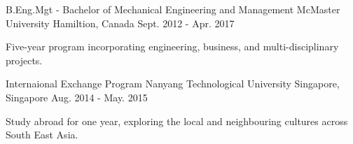 

\begin{cventries}

  \cventry
    {B.Eng.Mgt - Bachelor of Mechanical Engineering and Management} %
    {McMaster University} %
    {Hamiltion, Canada} %
    {Sept. 2012 -  Apr. 2017} %
    {
      \begin{cvitems} %
        \item {Five-year program incorporating engineering, business, and multi-disciplinary projects.}
      \end{cvitems}
    }

  \cventry
    {Internaional Exchange Program} %
    {Nanyang Technological University} %
    {Singapore, Singapore} %
    {Aug. 2014 - May. 2015} %
    {
      \begin{cvitems} %
        \item {Study abroad for one year, exploring the local and neighbouring cultures across South East Asia.}
      \end{cvitems}
    }

\end{cventries}
